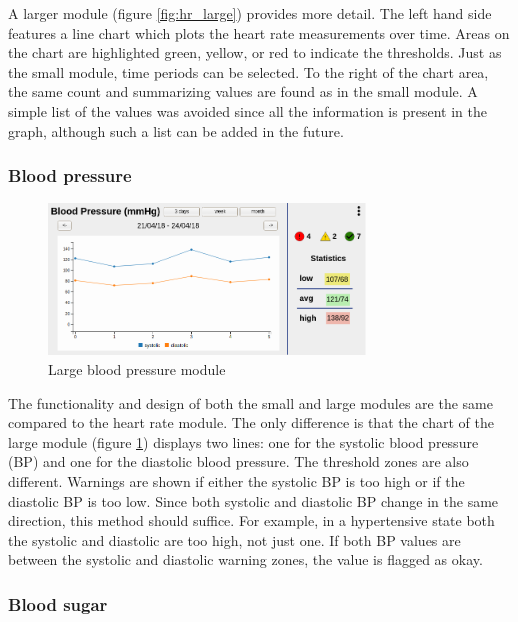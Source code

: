         A larger module (figure \ref{fig:hr_large}) provides more detail. The left hand side features a line chart which plots the heart rate measurements over time. Areas on the chart are highlighted green, yellow, or red to indicate the thresholds. Just as the small module, time periods can be selected. To the right of the chart area, the same count and summarizing values are found as in the small module. A simple list of the values was avoided since all the information is present in the graph, although such a list can be added in the future.

        \subsubsection{Blood pressure}
        
        \begin{figure}[!htb]
            \centering
            \includegraphics[width=0.75\textwidth]{chapters/3_design/mockups/bp_large}
            \caption{Large blood pressure module}\label{fig:bp_large}
        \end{figure}

        The functionality and design of both the small and large modules are the same compared to the heart rate module. The only difference is that the chart of the large module (figure \ref{fig:bp_large}) displays two lines: one for the systolic blood pressure (BP) and one for the diastolic blood pressure. The threshold zones are also different. Warnings are shown if either the systolic BP is too high or if the diastolic BP is too low. Since both systolic and diastolic BP change in the same direction, this method should suffice. For example, in a hypertensive state both the systolic and diastolic are too high, not just one. If both BP values are between the systolic and diastolic warning zones, the value is flagged as okay.

        \subsubsection{Blood sugar}

